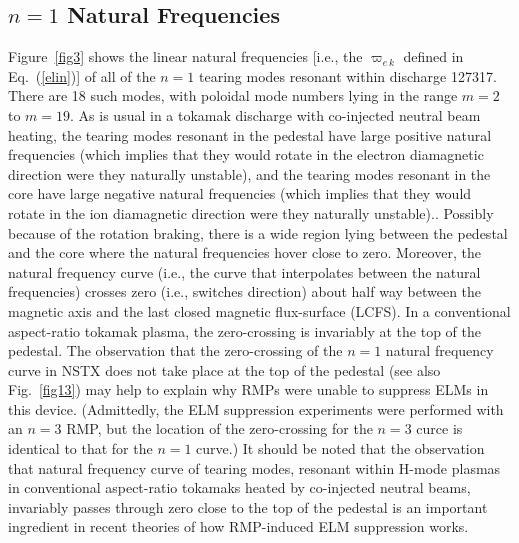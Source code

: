 \documentclass[12pt,prb,aps]{revtex4-1}
\begin{document}
\subsection{$n=1$ Natural Frequencies}
Figure~\ref{fig3} shows the linear natural frequencies [i.e., the $\varpi_{e\,k}$ defined in Eq.~(\ref{elin})] of all of the
$n=1$ tearing modes resonant within discharge 127317. There are 18 such modes, with poloidal mode numbers
lying in the range $m=2$ to $m=19$. As is usual in a tokamak discharge with co-injected neutral beam heating, the tearing modes resonant in the pedestal have large positive natural frequencies (which implies  that they would rotate in
the electron diamagnetic direction were they naturally unstable), and the tearing modes resonant in the core have large negative natural frequencies (which implies  that they would rotate in
the ion diamagnetic direction  were they naturally unstable).\cite{rftor3}. Possibly because of the rotation braking, there is a wide region lying between the pedestal and the core where the natural frequencies hover close to zero. Moreover,
the natural frequency curve (i.e., the curve that interpolates between the natural frequencies) crosses zero (i.e., switches direction) about half way between the magnetic axis and the last closed magnetic
flux-surface (LCFS). In a conventional aspect-ratio tokamak plasma, the zero-crossing is invariably at the top of the pedestal.\cite{rftor} The observation that 
the zero-crossing of the $n=1$ natural frequency curve  in NSTX does not take place at the top of the
pedestal (see also Fig.~\ref{fig13}) may help to explain why RMPs were unable to suppress ELMs in this device.\cite{nstx} (Admittedly, the
ELM suppression experiments were performed with an $n=3$ RMP, but the location of the zero-crossing for the
$n=3$ curce is identical to that for the $n=1$ curve.) It should be noted that the observation that  natural frequency curve 
of tearing modes, resonant within H-mode plasmas in conventional aspect-ratio tokamaks heated by co-injected neutral beams, invariably passes through zero close to the 
top of the pedestal is an important ingredient in recent theories of how RMP-induced ELM suppression works.
\cite{rftor,rftor1,rftor2,rftor3, hu}
\end{document}
